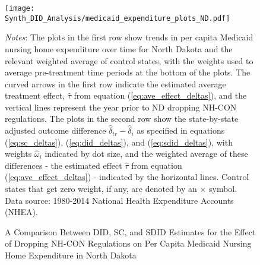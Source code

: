 \documentclass[../Main.tex]{subfiles}
\begin{document}
\newpage
\begin{figure}[t] 
	\begin{center}
	\caption{\label{fig:med_exp_plots_nd} \centering A Comparison Between DID, SC, and SDID Estimates for the Effect of Dropping NH-CON Regulations on Per Capita Medicaid Nursing Home Expenditure in North Dakota}
    \texttt{[image: Synth\_DID\_Analysis/medicaid\_expenditure\_plots\_ND.pdf]}
    \end{center}
    \footnotesize
		\textit{Notes}: The plots in the first row show trends in per capita Medicaid nursing home expenditure over time for North Dakota and the relevant weighted average of control states, with the weights used to average pre-treatment time periods at the bottom of the plots. The curved arrows in the first row indicate the estimated average treatment effect, $\hat{\tau}$ from equation (\ref{eq:ave_effect_deltas}), and the vertical lines represent the year prior to ND dropping NH-CON regulations. The plots in the second row show the state-by-state adjusted outcome difference $\hat{\delta}_{tr}-\hat{\delta}_i$ as specified in equations (\ref{eq:sc_deltas}), (\ref{eq:did_deltas}), and (\ref{eq:sdid_deltas}), with weights $\hat{\omega}_i$ indicated by dot size, and the weighted average of these differences - the estimated effect $\hat{\tau}$ from equation (\ref{eq:ave_effect_deltas}) - indicated by the horizontal lines. Control states that get zero weight, if any, are denoted by an $\times$ symbol. Data source: 1980-2014 National Health Expenditure Accounts (NHEA).
\end{figure}
\clearpage
\end{document}
